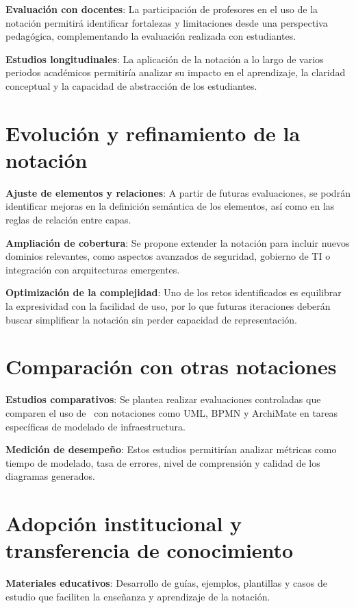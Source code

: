 \textbf{Evaluación con docentes}: La participación de profesores en el uso de la notación permitirá identificar fortalezas y limitaciones desde una perspectiva pedagógica, complementando la evaluación realizada con estudiantes.

\textbf{Estudios longitudinales}: La aplicación de la notación a lo largo de varios periodos académicos permitiría analizar su impacto en el aprendizaje, la claridad conceptual y la capacidad de abstracción de los estudiantes.

\section{Evolución y refinamiento de la notación}
\noindent

\textbf{Ajuste de elementos y relaciones}: A partir de futuras evaluaciones, se podrán identificar mejoras en la definición semántica de los elementos, así como en las reglas de relación entre capas.

\textbf{Ampliación de cobertura}: Se propone extender la notación para incluir nuevos dominios relevantes, como aspectos avanzados de seguridad, gobierno de TI o integración con arquitecturas emergentes.

\textbf{Optimización de la complejidad}: Uno de los retos identificados es equilibrar la expresividad con la facilidad de uso, por lo que futuras iteraciones deberán buscar simplificar la notación sin perder capacidad de representación.

\section{Comparación con otras notaciones}
\noindent

\textbf{Estudios comparativos}: Se plantea realizar evaluaciones controladas que comparen el uso de \NDITI~con notaciones como UML, BPMN y ArchiMate en tareas específicas de modelado de infraestructura.

\textbf{Medición de desempeño}: Estos estudios permitirían analizar métricas como tiempo de modelado, tasa de errores, nivel de comprensión y calidad de los diagramas generados.

\section{Adopción institucional y transferencia de conocimiento}
\noindent

\textbf{Materiales educativos}: Desarrollo de guías, ejemplos, plantillas y casos de estudio que faciliten la enseñanza y aprendizaje de la notación.

